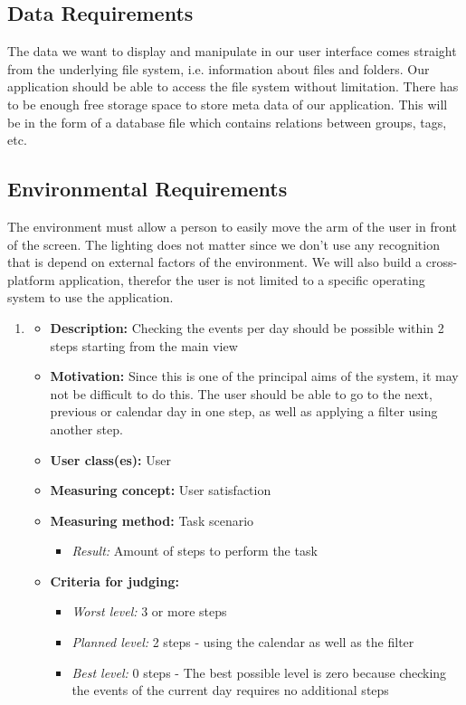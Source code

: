 \documentclass{article}
\begin{document}
\subsection{Data Requirements}
The data we want to display and manipulate in our user interface comes straight from the underlying file system, i.e. information about files and folders. Our application should be able to access the file system without limitation.
There has to be enough free storage space to store meta data of our application. This will be in the form of a database file which contains relations between groups, tags, etc.

\subsection{Environmental Requirements}
The environment must allow a person to easily move the arm of the user in front of the screen. The lighting does not matter since we don't use any recognition that is depend on external factors of the environment. We will also build a cross-platform application, therefor the user is not limited to a specific operating system to use the application.


\begin{enumerate}
\item 
    \begin{itemize}[label=$ $]
    \item \textbf{Description:} Checking the events per day should be possible within 2 steps starting from the main view
    \item \textbf{Motivation:} Since this is one of the principal aims of the system, it may not be difficult to do this. The user should be able to go to the next, previous or calendar day in one step, as well as applying a filter using another step.
    \item \textbf{User class(es):} User
    \item \textbf{Measuring concept:} User satisfaction
    \item \textbf{Measuring method:} Task scenario
        \begin{itemize}
        \item \textit{Result:} Amount of steps to perform the task
        \end{itemize}
    \item \textbf{Criteria for judging:}
        \begin{itemize}
        \item \textit{Worst level:} 3 or more steps
        \item \textit{Planned level:} 2 steps - using the calendar as well as the filter
        \item \textit{Best level:} 0 steps - The best possible level is zero because checking the events of the current day requires no additional steps
        \end{itemize}
    \end{itemize}
\end{enumerate}
    
\end{document}
